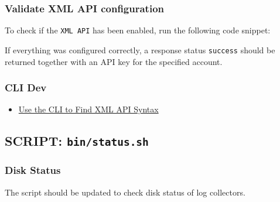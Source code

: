 \hypertarget{validate-xml-api-configuration}{%
\subsubsection{Validate XML API
configuration}\label{validate-xml-api-configuration}}

To check if the \texttt{XML\ API} has been enabled, run the following
code snippet:

\begin{Shaded}
\begin{Highlighting}[]
\end{Highlighting}
\end{Shaded}

If everything was configured correctly, a response status
\texttt{success} should be returned together with an API key for the
specified account.

\hypertarget{cli-dev}{%
\subsubsection{CLI Dev}\label{cli-dev}}

\begin{itemize}
\tightlist
\item
  \href{https://docs.paloaltonetworks.com/pan-os/11-0/pan-os-panorama-api/get-started-with-the-pan-os-xml-api/explore-the-api/use-the-cli-to-find-xml-api-syntax}{Use
  the CLI to Find XML API Syntax}
\end{itemize}

\hypertarget{script-binstatus.sh}{%
\subsection{\texorpdfstring{SCRIPT:
\texttt{bin/status.sh}}{SCRIPT: bin/status.sh}}\label{script-binstatus.sh}}

\hypertarget{disk-status}{%
\subsubsection{Disk Status}\label{disk-status}}

The script should be updated to check disk status of log collectors.


